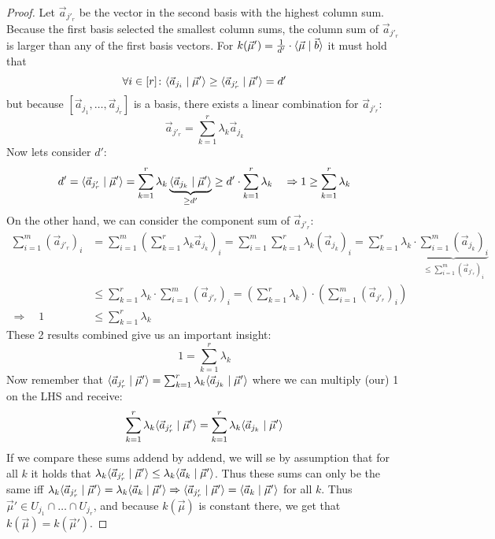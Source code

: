 \begin{proof}
    Let $\vec a_{j'_r}$ be the vector in the second basis with the highest column sum. Because the first basis selected the smallest column sums, the column sum of $\vec a_{j'_r}$ is larger than any of the first basis vectors. For $k(\vec \mu') = \frac{1}{d'}\cdot\langle \vec{\mu} \mid \vec b \rangle$ it must hold that
    $$\forall i \in [r]\colon \langle \vec a_{j_i} \mid \vec\mu' \rangle \geq \langle \vec a_{j'_r} \mid \vec\mu' \rangle = d'$$
    but because $[\vec a_{j_1}, \dots, \vec a_{j_r}]$ is a basis, there exists a linear combination for $\vec a_{j'_r}$:
    $$\vec a_{j'_r} = \sum_{k=1}^{r}\lambda_k\vec a_{j_k}$$
    Now lets consider $d'$:
    $$d' = \langle \vec a_{j'_r} \mid \vec\mu' \rangle = \sum_{k=1}^{r}\lambda_k\underbrace{\langle \vec a_{j_k} \mid \vec\mu' \rangle}_{\geq d'} \geq d'\cdot \sum_{k=1}^{r}\lambda_k \quad\Rightarrow 1 \geq \sum_{k=1}^{r}\lambda_k$$
    On the other hand, we can consider the component sum of $\vec a_{j'_r}$:
    \begin{align*}
        \sum_{i=1}^{m} (\vec a_{j'_r})_i &= \sum_{i=1}^{m} \left(\sum_{k=1}^{r}\lambda_k \vec a_{j_k}\right)_i = \sum_{i=1}^{m} \sum_{k=1}^{r}\lambda_k \left(\vec a_{j_k}\right)_i = \sum_{k=1}^{r} \lambda_k \cdot\underbrace{\sum_{i=1}^{m} \left(\vec a_{j_k}\right)_i}_{\leq \sum_{i=1}^{m} (\vec a_{j'_r})_i}\\
        &\leq \sum_{k=1}^{r} \lambda_k \cdot\sum_{i=1}^{m} (\vec a_{j'_r})_i = \left(\sum_{k=1}^{r} \lambda_k\right) \cdot\left(\sum_{i=1}^{m} (\vec a_{j'_r})_i\right)\\
        \Rightarrow\quad 1 &\leq \sum_{k=1}^{r} \lambda_k
    \end{align*}
    These 2 results combined give us an important insight:
    $$1 = \sum_{k=1}^{r} \lambda_k$$
    Now remember that $\langle \vec a_{j'_r} \mid \vec\mu' \rangle = \sum_{k=1}^{r}\lambda_k\langle \vec a_{j_k} \mid \vec\mu' \rangle$ where we can multiply (our) 1 on the LHS and receive:
    $$\sum_{k=1}^{r}\lambda_k\langle \vec a_{j'_r} \mid \vec\mu' \rangle = \sum_{k=1}^{r}\lambda_k\langle \vec a_{j_k} \mid \vec\mu' \rangle$$
    If we compare these sums addend by addend, we will se by assumption that for all $k$ it holds that $\lambda_k\langle \vec a_{j'_r} \mid \vec\mu' \rangle \leq \lambda_k\langle \vec a_k \mid \vec\mu' \rangle$. Thus these sums can only be the same iff $\lambda_k\langle \vec a_{j'_r} \mid \vec\mu' \rangle = \lambda_k\langle \vec a_k \mid \vec\mu' \rangle \Rightarrow \langle \vec a_{j'_r} \mid \vec\mu' \rangle = \langle \vec a_k \mid \vec\mu' \rangle$ for all $k$. Thus $\vec\mu' \in U_{j_1} \cap \dots \cap U_{j_r}$, and because $k(\vec\mu)$ is constant there, we get that $k(\vec\mu) = k(\vec\mu')$.
\end{proof}

